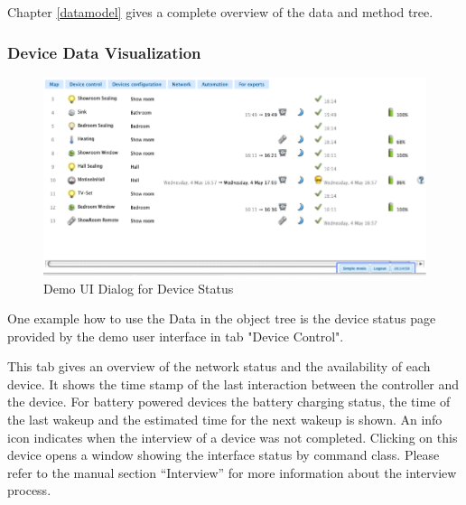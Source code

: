 Chapter \ref{datamodel} gives a complete overview of the data and method tree.

\subsubsection {Device Data Visualization}

\begin{figure} 
\begin{center}
\includegraphics[scale=0.8]{pics/devicestatus.png}
\caption{Demo UI Dialog for Device Status}
\label{c4:demostatus} 
\end{center}
 \end{figure}
 
One example how to use the Data in the object tree is the device status page provided by the demo user interface in tab "Device Control".

 This tab gives an overview of the network status and the availability of each device. It shows the time stamp of the 
 last interaction between the controller  and the device. For battery powered devices the battery charging status, 
 the time of the last wakeup and the estimated time for the next wakeup is shown.
An info icon indicates when the interview of a device was not completed. Clicking on this device opens a window 
showing the interface status by command class. 
Please refer to the manual section “Interview” for more information about the interview process.

